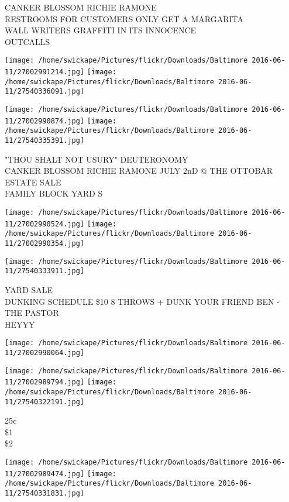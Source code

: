 \documentclass[10pt,letterpaper]{article}
\begin{document}
CANKER BLOSSOM RICHIE RAMONE\\
RESTROOMS FOR CUSTOMERS ONLY GET A MARGARITA\\
WALL WRITERS GRAFFITI IN ITS INNOCENCE\\
OUTCALLS
\pagebreak

\texttt{[image: /home/swickape/Pictures/flickr/Downloads/Baltimore 2016-06-11/27002991214.jpg]}
\texttt{[image: /home/swickape/Pictures/flickr/Downloads/Baltimore 2016-06-11/27540336091.jpg]}

\texttt{[image: /home/swickape/Pictures/flickr/Downloads/Baltimore 2016-06-11/27002990874.jpg]}
\texttt{[image: /home/swickape/Pictures/flickr/Downloads/Baltimore 2016-06-11/27540335391.jpg]}

"THOU SHALT NOT USURY" DEUTERONOMY\\
CANKER BLOSSOM RICHIE RAMONE JULY 2nD @ THE OTTOBAR\\
ESTATE SALE\\
FAMILY BLOCK YARD S
\pagebreak

\texttt{[image: /home/swickape/Pictures/flickr/Downloads/Baltimore 2016-06-11/27002990524.jpg]}
\texttt{[image: /home/swickape/Pictures/flickr/Downloads/Baltimore 2016-06-11/27002990354.jpg]}

\vspace{0.25in}
\texttt{[image: /home/swickape/Pictures/flickr/Downloads/Baltimore 2016-06-11/27540333911.jpg]}

YARD SALE\\
DUNKING SCHEDULE \$10 8 THROWS + DUNK YOUR FRIEND BEN {-} THE PASTOR\\
HEYYY
\pagebreak

\texttt{[image: /home/swickape/Pictures/flickr/Downloads/Baltimore 2016-06-11/27002990064.jpg]}

\vspace{0.25in}
\texttt{[image: /home/swickape/Pictures/flickr/Downloads/Baltimore 2016-06-11/27002989794.jpg]}
\texttt{[image: /home/swickape/Pictures/flickr/Downloads/Baltimore 2016-06-11/27540322191.jpg]}

25¢\\
\$1\\
\$2
\pagebreak

\texttt{[image: /home/swickape/Pictures/flickr/Downloads/Baltimore 2016-06-11/27002989474.jpg]}
\texttt{[image: /home/swickape/Pictures/flickr/Downloads/Baltimore 2016-06-11/27540331831.jpg]}
\end{document}
